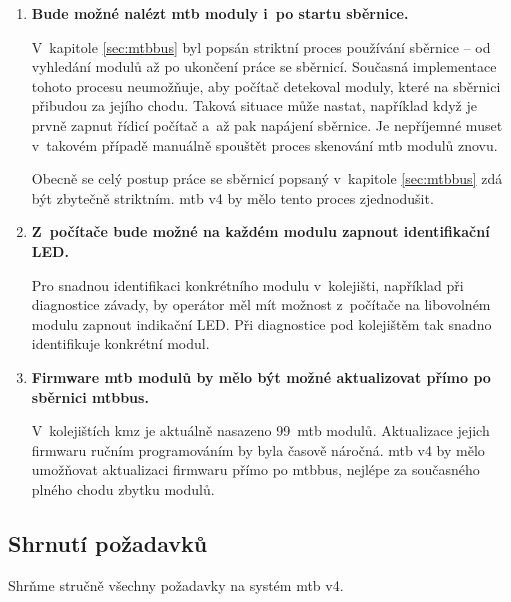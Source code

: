 \begin{enumerate}
\item \textbf{Bude možné nalézt \gls{mtb} moduly i~po startu sběrnice.}

	V~kapitole \ref{sec:mtbbus} byl popsán striktní proces používání
	sběrnice – od vyhledání modulů až po ukončení práce se sběrnicí. Současná
	implementace tohoto procesu neumožňuje, aby počítač detekoval moduly, které
	na sběrnici přibudou za jejího chodu. Taková situace může nastat, například
	když je prvně zapnut řídicí počítač a~až pak napájení sběrnice. Je
	nepříjemné muset v~takovém případě manuálně spouštět proces skenování
	\gls{mtb} modulů znovu.

	Obecně se celý postup práce se sběrnicí popsaný v~kapitole \ref{sec:mtbbus}
	zdá být zbytečně striktním. \gls{mtb} v4 by mělo tento proces zjednodušit.

\item \textbf{Z~počítače bude možné na každém modulu zapnout identifikační LED.}

	Pro snadnou identifikaci konkrétního modulu v~kolejišti, například při
	diagnostice závady, by operátor měl mít možnost z~počítače na libovolném
	modulu zapnout indikační LED. Při diagnostice pod kolejištěm tak snadno
	identifikuje konkrétní modul.

\item \textbf{Firmware \gls{mtb} modulů by mělo být možné aktualizovat přímo
	po sběrnici \gls{mtbbus}.}

	V~kolejištích \gls{kmz} je aktuálně nasazeno 99~\gls{mtb} modulů.
	Aktualizace jejich firmwaru ručním programováním by byla časově náročná.
	\gls{mtb} v4 by mělo umožňovat aktualizaci firmwaru přímo po
	\gls{mtbbus}, nejlépe za současného plného chodu zbytku modulů.

\end{enumerate}

\subsection{Shrnutí požadavků} \label{sub:mtbbus-req-summary}

Shrňme stručně všechny požadavky na systém \gls{mtb} v4.

